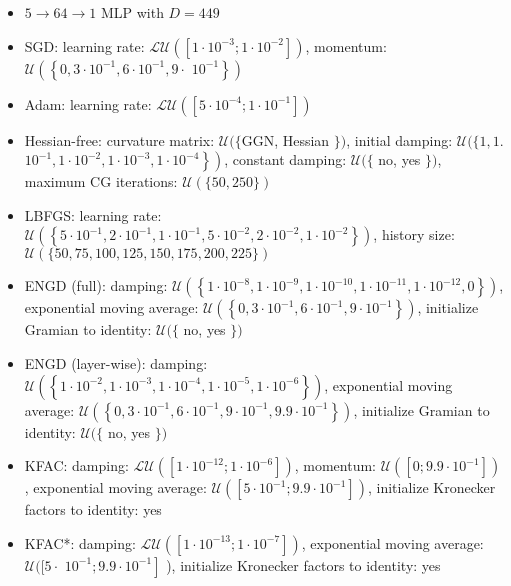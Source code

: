 \documentclass[10pt]{article}
\begin{document}
\begin{itemize}
  \item $5 \rightarrow 64 \rightarrow 1$ MLP with $D=449$
  \item SGD: learning rate: $\mathcal{L U}\left(\left[1 \cdot 10^{-3} ; 1 \cdot 10^{-2}\right]\right)$, momentum: $\mathcal{U}\left(\left\{0,3 \cdot 10^{-1}, 6 \cdot 10^{-1}, 9 \cdot\right.\right.$ $\left.\left.10^{-1}\right\}\right)$
  \item Adam: learning rate: $\mathcal{L U}\left(\left[5 \cdot 10^{-4} ; 1 \cdot 10^{-1}\right]\right)$
  \item Hessian-free: curvature matrix: $\mathcal{U}(\{\mathrm{GGN}$, Hessian $\})$, initial damping: $\mathcal{U}(\{1,1$. $\left.\left.10^{-1}, 1 \cdot 10^{-2}, 1 \cdot 10^{-3}, 1 \cdot 10^{-4}\right\}\right)$, constant damping: $\mathcal{U}(\{$ no, yes $\})$, maximum CG iterations: $\mathcal{U}(\{50,250\})$
  \item LBFGS: learning rate: $\mathcal{U}\left(\left\{5 \cdot 10^{-1}, 2 \cdot 10^{-1}, 1 \cdot 10^{-1}, 5 \cdot 10^{-2}, 2 \cdot 10^{-2}, 1 \cdot 10^{-2}\right\}\right)$, history size: $\mathcal{U}(\{50,75,100,125,150,175,200,225\})$
  \item ENGD (full): damping: $\mathcal{U}\left(\left\{1 \cdot 10^{-8}, 1 \cdot 10^{-9}, 1 \cdot 10^{-10}, 1 \cdot 10^{-11}, 1 \cdot 10^{-12}, 0\right\}\right)$, exponential moving average: $\mathcal{U}\left(\left\{0,3 \cdot 10^{-1}, 6 \cdot 10^{-1}, 9 \cdot 10^{-1}\right\}\right)$, initialize Gramian to identity: $\mathcal{U}(\{$ no, yes $\})$
  \item ENGD (layer-wise): damping: $\mathcal{U}\left(\left\{1 \cdot 10^{-2}, 1 \cdot 10^{-3}, 1 \cdot 10^{-4}, 1 \cdot 10^{-5}, 1 \cdot 10^{-6}\right\}\right)$, exponential moving average: $\mathcal{U}\left(\left\{0,3 \cdot 10^{-1}, 6 \cdot 10^{-1}, 9 \cdot 10^{-1}, 9.9 \cdot 10^{-1}\right\}\right)$, initialize Gramian to identity: $\mathcal{U}(\{$ no, yes $\})$
  \item KFAC: damping: $\mathcal{L U}\left(\left[1 \cdot 10^{-12} ; 1 \cdot 10^{-6}\right]\right)$, momentum: $\mathcal{U}\left(\left[0 ; 9.9 \cdot 10^{-1}\right]\right)$, exponential moving average: $\mathcal{U}\left(\left[5 \cdot 10^{-1} ; 9.9 \cdot 10^{-1}\right]\right)$, initialize Kronecker factors to identity: yes
  \item KFAC*: damping: $\mathcal{L U}\left(\left[1 \cdot 10^{-13} ; 1 \cdot 10^{-7}\right]\right)$, exponential moving average: $\mathcal{U}([5 \cdot$ $\left.10^{-1} ; 9.9 \cdot 10^{-1}\right]$ ), initialize Kronecker factors to identity: yes

\end{itemize}
\end{document}
